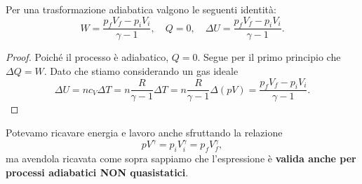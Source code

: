 \begin{proposition}\label{EnergieAdiabatica}
Per una trasformazione adiabatica valgono le seguenti identit\`a:
\[W=\frac{p_fV_f-p_iV_i}{\gamma-1},\quad
Q=0,\quad
\Delta U=\frac{p_fV_f-p_iV_i}{\gamma-1}.\]
\end{proposition}
\begin{proof}
Poich\'e il processo \`e adiabatico, $Q=0$. Segue per il primo principio che $\Delta Q=W$. Dato che stiamo considerando un gas ideale
\[\Delta U=nc_V\Delta T=n\frac R{\gamma-1}\Delta T=n\frac R{\gamma-1}\Delta (pV)=\frac{p_fV_f-p_iV_i}{\gamma-1}.\]
\end{proof}

\begin{remark}
Potevamo ricavare energia e lavoro anche sfruttando la relazione \[pV^\gamma=p_iV_i^\gamma=p_fV_f^\gamma,\] ma avendola ricavata come sopra sappiamo che l'espressione \`e \textbf{valida anche per processi adiabatici NON quasistatici}.
\end{remark}
